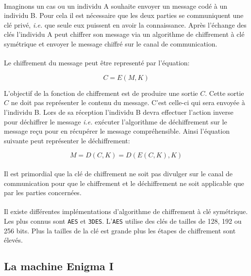 \documentclass[letterpaper]{article}
\begin{document}
 \paragraph{}
Imaginons un cas ou un individu A souhaite envoyer un message codé à un individu
B. Pour cela il est nécessaire que les deux parties se communiquent une clé privé, \textit{i.e.} que seule
eux puissent en avoir la connaissance. Après l'échange des clés l'individu A peut chiffrer son message
via un algorithme de chiffrement à clé symétrique et envoyer le message chiffré sur le canal de communication.
\paragraph{}
Le chiffrement du message peut être representé par l'équation:

\[
  C = E(M, K)
\]


L'objectif de la fonction de chiffrement est de produire une sortie $C$. Cette sortie $C$
ne doit pas représenter le contenu du message. C'est celle-ci
qui sera envoyée à l'individu B. Lors de sa réception l'individu B devra effectuer l'action
inverse pour déchiffrer le message \textit{i.e.} exécuter l'algorithme de déchiffrement sur le message reçu
pour en récupérer le message compréhensible. Ainsi l'équation suivante peut
représenter le déchiffrement:

\[
  M = D(C, K) = D(E(C, K), K)
\]

\paragraph{}
Il est primordial que la clé de chiffrement ne soit pas divulger sur le canal de communication
pour que le chiffrement et le déchiffrement ne soit applicable que par les parties concernées. 

\paragraph{}

Il existe différentes implémentations d'algorithme de chiffrement à clé symétrique. Les plus connus sont \texttt{AES} et \texttt{3DES}. L'\texttt{AES} utilise des clés de tailles de 128, 192 ou 256 bits. Plus la tailles de la clé est grande plus les étapes de chiffrement sont élevés.

\subsection{La machine Enigma I}
\end{document}
